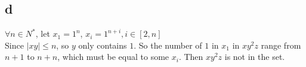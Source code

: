 \documentclass{ctexart}
\begin{document}
\subsection{d}
$\forall n \in N^* $, let $x_1=1^n$, $x_i=1^{n+i}, i\in [2,n]$\\
Since $|xy|\leq n$, so $y$ only contains $1$. So the number of $1$ in $x_1$ in $xy^2z$
range from $n+1$ to $n+n$, which must be equal to some $x_i$. Then $xy^2z$ is not
in the set.
\end{document}

